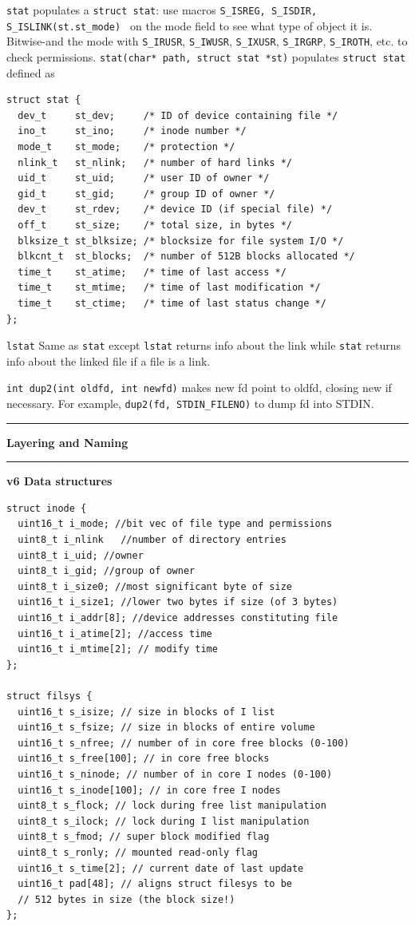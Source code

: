 \documentclass{article}
\begin{document}
\begin{multicols}{2}
  {\tt stat} populates a {\tt struct stat}: use macros
  {\tt S\_ISREG, S\_ISDIR, S\_ISLINK(st.st\_mode) } on the mode field to see
  what type of object it is. Bitwise-and the mode with \texttt{S\_IRUSR},
  \texttt{S\_IWUSR}, \texttt{S\_IXUSR}, \texttt{S\_IRGRP}, \texttt{S\_IROTH},
  etc. to check permissions.
  {\tt stat(char* path, struct stat *st)} populates \texttt{struct stat} defined
  as
  {\footnotesize
  \begin{verbatim}
struct stat {
  dev_t     st_dev;     /* ID of device containing file */
  ino_t     st_ino;     /* inode number */
  mode_t    st_mode;    /* protection */
  nlink_t   st_nlink;   /* number of hard links */
  uid_t     st_uid;     /* user ID of owner */
  gid_t     st_gid;     /* group ID of owner */
  dev_t     st_rdev;    /* device ID (if special file) */
  off_t     st_size;    /* total size, in bytes */
  blksize_t st_blksize; /* blocksize for file system I/O */
  blkcnt_t  st_blocks;  /* number of 512B blocks allocated */
  time_t    st_atime;   /* time of last access */
  time_t    st_mtime;   /* time of last modification */
  time_t    st_ctime;   /* time of last status change */
}; \end{verbatim}}
  {\tt lstat} Same as {\tt stat} except {\tt lstat} returns info about the
  link while {\tt stat} returns info about the linked file if a file is a link.

  {\tt int dup2(int oldfd, int newfd)} makes new fd point to oldfd, closing new
  if necessary. For example, {\tt dup2(fd, STDIN\_FILENO)} to dump fd into STDIN.

  \noindent\rule{4cm}{0.4pt}

  {\bf Layering and Naming}

  \noindent\rule{4cm}{0.4pt}

  {\bf v6 Data structures}
  \begin{verbatim}
struct inode {
  uint16_t i_mode; //bit vec of file type and permissions
  uint8_t i_nlink	//number of directory entries
  uint8_t i_uid; //owner
  uint8_t i_gid; //group of owner
  uint8_t i_size0; //most significant byte of size
  uint16_t i_size1; //lower two bytes if size (of 3 bytes)
  uint16_t i_addr[8]; //device addresses constituting file
  uint16_t i_atime[2]; //access time
  uint16_t i_mtime[2]; // modify time
};

struct filsys {
  uint16_t s_isize; // size in blocks of I list
  uint16_t s_fsize; // size in blocks of entire volume
  uint16_t s_nfree; // number of in core free blocks (0-100)
  uint16_t s_free[100]; // in core free blocks
  uint16_t s_ninode; // number of in core I nodes (0-100)
  uint16_t s_inode[100]; // in core free I nodes
  uint8_t s_flock; // lock during free list manipulation
  uint8_t s_ilock; // lock during I list manipulation
  uint8_t s_fmod; // super block modified flag
  uint8_t s_ronly; // mounted read-only flag
  uint16_t s_time[2]; // current date of last update
  uint16_t pad[48]; // aligns struct filesys to be
  // 512 bytes in size (the block size!)
};


\end{verbatim}
\end{multicols}
\end{document}
